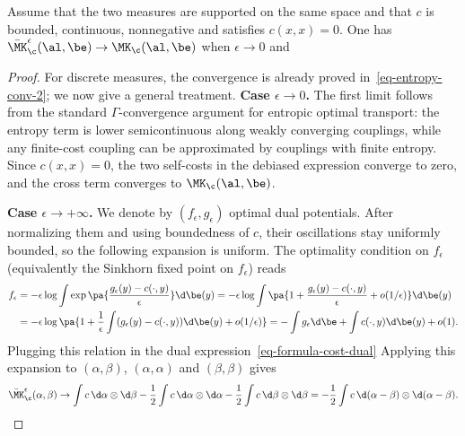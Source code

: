 	\begin{prop}
		Assume that the two measures are supported on the same space and that $c$ is bounded, continuous, nonnegative and satisfies $c(x,x)=0$.
		One has $\bar\MK_\c^\epsilon(\al,\be) \rightarrow \MK_\c(\al,\be)$ when $\epsilon\rightarrow 0$ and
\end{prop}
\begin{proof}
		For discrete measures, the convergence is already proved in~\eqref{eq-entropy-conv-2}; we now give a general treatment.
	\textbf{Case $\epsilon \rightarrow 0$.}
	The first limit follows from the standard $\Gamma$-convergence argument for entropic optimal transport: the entropy term is lower semicontinuous along weakly converging couplings, while any finite-cost coupling can be approximated by couplings with finite entropy. Since $c(x,x)=0$, the two self-costs in the debiased expression converge to zero, and the cross term converges to $\MK_\c(\al,\be)$.

		\textbf{Case $\epsilon \rightarrow +\infty$.} We denote by $(f_\epsilon,g_\epsilon)$ optimal dual potentials. After normalizing them and using boundedness of $c$, their oscillations stay uniformly bounded, so the following expansion is uniform. The optimality condition on $f_\epsilon$ (equivalently the Sinkhorn fixed point on $f_\epsilon$) reads
		\begin{align*}
			f_\epsilon &= -\epsilon \log \int \exp\pa{ \frac{g_\epsilon(y) - c(\cdot,y)}{\epsilon} } \d \be(y)
			=	-\epsilon \log \int \pa{ 1 + \frac{g_\epsilon(y) - c(\cdot,y)}{\epsilon} + o(1/\epsilon) } \d \be(y) \\
			&=	-\epsilon \log\pa{1+\frac{1}{\epsilon}\int (g_\epsilon(y)-c(\cdot,y))\d\be(y)+o(1/\epsilon)}
			= - \int g_\epsilon \d\be + \int c(\cdot,y) \d \be(y) + o(1).
		\end{align*}
	Plugging this relation in the dual expression~\eqref{eq-formula-cost-dual}
	Applying this expansion to $(\alpha,\beta)$, $(\alpha,\alpha)$ and $(\beta,\beta)$ gives
	\[
		\bar\MK_\c^\epsilon(\alpha,\beta)
		\to
		\int c\,\d\alpha\otimes\d\beta
		-\frac12\int c\,\d\alpha\otimes\d\alpha
		-\frac12\int c\,\d\beta\otimes\d\beta
		=
		-\frac12\int c\,\d(\alpha-\beta)\otimes\d(\alpha-\beta).
	\]
\end{proof}

